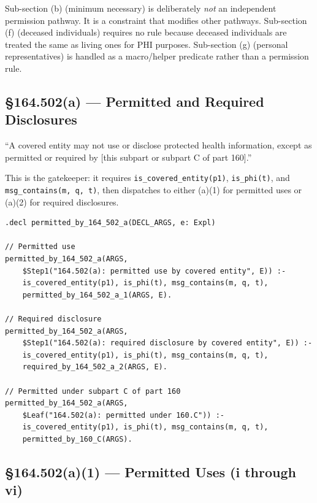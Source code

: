 \documentclass[11pt,letterpaper]{article}
\begin{document}
\begin{designbox}
Sub-section (b) (minimum necessary) is deliberately \emph{not} an independent permission pathway. It is a constraint that modifies other pathways. Sub-section (f) (deceased individuals) requires no rule because deceased individuals are treated the same as living ones for PHI purposes. Sub-section (g) (personal representatives) is handled as a macro/helper predicate rather than a permission rule.
\end{designbox}

\subsection{\S 164.502(a) --- Permitted and Required Disclosures}

\begin{hipaabox}
``A covered entity may not use or disclose protected health information, except as permitted or required by [this subpart or subpart C of part 160].''
\end{hipaabox}

This is the gatekeeper: it requires \texttt{is\_covered\_entity(p1)}, \texttt{is\_phi(t)}, and \texttt{msg\_contains(m, q, t)}, then dispatches to either (a)(1) for permitted uses or (a)(2) for required disclosures.

\begin{lstlisting}[style=soufflestyle,caption={\S 164.502(a)}]
.decl permitted_by_164_502_a(DECL_ARGS, e: Expl)

// Permitted use
permitted_by_164_502_a(ARGS,
    $Step1("164.502(a): permitted use by covered entity", E)) :-
    is_covered_entity(p1), is_phi(t), msg_contains(m, q, t),
    permitted_by_164_502_a_1(ARGS, E).

// Required disclosure
permitted_by_164_502_a(ARGS,
    $Step1("164.502(a): required disclosure by covered entity", E)) :-
    is_covered_entity(p1), is_phi(t), msg_contains(m, q, t),
    required_by_164_502_a_2(ARGS, E).

// Permitted under subpart C of part 160
permitted_by_164_502_a(ARGS,
    $Leaf("164.502(a): permitted under 160.C")) :-
    is_covered_entity(p1), is_phi(t), msg_contains(m, q, t),
    permitted_by_160_C(ARGS).
\end{lstlisting}

\subsection{\S 164.502(a)(1) --- Permitted Uses (i through vi)}
\end{document}
